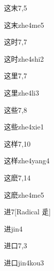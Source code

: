 \begin{entry}{这末}{7,5}
  \begin{phonetics}{这末}{zhe4me5}
  \end{phonetics}
\end{entry}

\begin{entry}{这时}{7,7}
  \begin{phonetics}{这时}{zhe4shi2}
  \end{phonetics}
\end{entry}

\begin{entry}{这里}{7,7}
  \begin{phonetics}{这里}{zhe4li3}
  \end{phonetics}
\end{entry}

\begin{entry}{这些}{7,8}
  \begin{phonetics}{这些}{zhe4xie1}
  \end{phonetics}
\end{entry}

\begin{entry}{这样}{7,10}
  \begin{phonetics}{这样}{zhe4yang4}
  \end{phonetics}
\end{entry}

\begin{entry}{这麽}{7,14}
  \begin{phonetics}{这麽}{zhe4me5}
  \end{phonetics}
\end{entry}

\begin{entry}{进}{7}[Radical 辵]
  \begin{phonetics}{进}{jin4}
  \end{phonetics}
\end{entry}

\begin{entry}{进口}{7,3}
  \begin{phonetics}{进口}{jin4kou3}
  \end{phonetics}
\end{entry}

